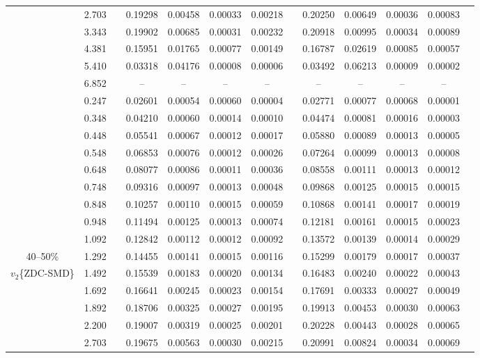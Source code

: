 \documentclass[aps,prc,superscriptaddress,showpacs,floatfix,twocolumn]{revtex4}
\begin{document}
\begin{table}[htbp]
\begin{ruledtabular}
\begin{tabular}{c|cccccccccccc}
 & 2.703 && 0.19298 & 0.00458 & 0.00033 & 0.00218 & & 0.20250 & 0.00649 & 0.00036 & 0.00083 \\ 
 & 3.343 && 0.19902 & 0.00685 & 0.00031 & 0.00232 & & 0.20918 & 0.00995 & 0.00034 & 0.00089 \\ 
 & 4.381 && 0.15951 & 0.01765 & 0.00077 & 0.00149 & & 0.16787 & 0.02619 & 0.00085 & 0.00057 \\ 
 & 5.410 && 0.03318 & 0.04176 & 0.00008 & 0.00006 & & 0.03492 & 0.06213 & 0.00009 & 0.00002 \\ 
 & 6.852 && -- & -- & -- & -- & & -- & -- & -- & -- \\ 
\hline 
 & 0.247 && 0.02601 & 0.00054 & 0.00060 & 0.00004 & & 0.02771 & 0.00077 & 0.00068 & 0.00001 \\ 
 & 0.348 && 0.04210 & 0.00060 & 0.00014 & 0.00010 & & 0.04474 & 0.00081 & 0.00016 & 0.00003 \\ 
 & 0.448 && 0.05541 & 0.00067 & 0.00012 & 0.00017 & & 0.05880 & 0.00089 & 0.00013 & 0.00005 \\ 
 & 0.548 && 0.06853 & 0.00076 & 0.00012 & 0.00026 & & 0.07264 & 0.00099 & 0.00013 & 0.00008 \\ 
 & 0.648 && 0.08077 & 0.00086 & 0.00011 & 0.00036 & & 0.08558 & 0.00111 & 0.00013 & 0.00012 \\ 
 & 0.748 && 0.09316 & 0.00097 & 0.00013 & 0.00048 & & 0.09868 & 0.00125 & 0.00015 & 0.00015 \\ 
 & 0.848 && 0.10257 & 0.00110 & 0.00015 & 0.00059 & & 0.10868 & 0.00141 & 0.00017 & 0.00019 \\ 
 & 0.948 && 0.11494 & 0.00125 & 0.00013 & 0.00074 & & 0.12181 & 0.00161 & 0.00015 & 0.00023 \\ 
 & 1.092 && 0.12842 & 0.00112 & 0.00012 & 0.00092 & & 0.13572 & 0.00139 & 0.00014 & 0.00029 \\ 
40--50\%
 & 1.292 && 0.14455 & 0.00141 & 0.00015 & 0.00116 & & 0.15299 & 0.00179 & 0.00017 & 0.00037 \\ 
$v_2$\{ZDC-SMD\}
 & 1.492 && 0.15539 & 0.00183 & 0.00020 & 0.00134 & & 0.16483 & 0.00240 & 0.00022 & 0.00043 \\ 
 & 1.692 && 0.16641 & 0.00245 & 0.00023 & 0.00154 & & 0.17691 & 0.00333 & 0.00027 & 0.00049 \\ 
 & 1.892 && 0.18706 & 0.00325 & 0.00027 & 0.00195 & & 0.19913 & 0.00453 & 0.00030 & 0.00063 \\ 
 & 2.200 && 0.19007 & 0.00319 & 0.00025 & 0.00201 & & 0.20228 & 0.00443 & 0.00028 & 0.00065 \\ 
 & 2.703 && 0.19675 & 0.00563 & 0.00030 & 0.00215 & & 0.20991 & 0.00824 & 0.00034 & 0.00069 \\ 

\end{tabular}
\end{ruledtabular}
\end{table}
\end{document}
